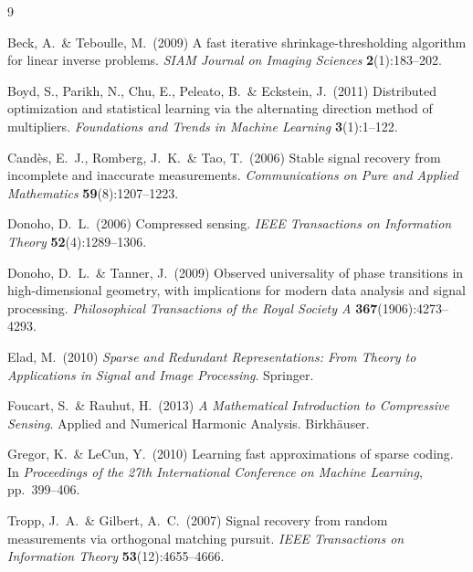 \documentclass{article}
\begin{document}
{
  \small
  \begin{thebibliography}{9}

    Beck, A.\ \& Teboulle, M.\ (2009) A fast iterative shrinkage-thresholding algorithm for linear inverse problems. {\it SIAM Journal on Imaging Sciences} {\bf 2}(1):183--202.

    Boyd, S., Parikh, N., Chu, E., Peleato, B.\ \& Eckstein, J.\ (2011) Distributed optimization and statistical learning via the alternating direction method of multipliers. {\it Foundations and Trends in Machine Learning} {\bf 3}(1):1--122.

    Cand\`es, E.\ J., Romberg, J.\ K.\ \& Tao, T.\ (2006) Stable signal recovery from incomplete and inaccurate measurements. {\it Communications on Pure and Applied Mathematics} {\bf 59}(8):1207--1223.

    Donoho, D.\ L.\ (2006) Compressed sensing. {\it IEEE Transactions on Information Theory} {\bf 52}(4):1289--1306.

    Donoho, D.\ L.\ \& Tanner, J.\ (2009) Observed universality of phase transitions in high-dimensional geometry, with implications for modern data analysis and signal processing. {\it Philosophical Transactions of the Royal Society A} {\bf 367}(1906):4273--4293.

    Elad, M.\ (2010) {\it Sparse and Redundant Representations: From Theory to Applications in Signal and Image Processing}. Springer.

    Foucart, S.\ \& Rauhut, H.\ (2013) {\it A Mathematical Introduction to Compressive Sensing}. Applied and Numerical Harmonic Analysis. Birkh\"auser.

    Gregor, K.\ \& LeCun, Y.\ (2010) Learning fast approximations of sparse coding. In {\it Proceedings of the 27th International Conference on Machine Learning}, pp.\ 399--406.

    Tropp, J.\ A.\ \& Gilbert, A.\ C.\ (2007) Signal recovery from random measurements via orthogonal matching pursuit. {\it IEEE Transactions on Information Theory} {\bf 53}(12):4655--4666.

  \end{thebibliography}
}


% 
\end{document}
